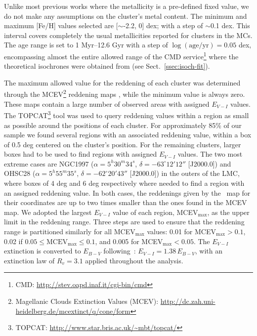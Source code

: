 \documentclass{aa}
\begin{document}
Unlike most previous works where the metallicity is a pre-defined fixed
value, we do not make any assumptions on the cluster's metal content. The
minimum and maximum [Fe/H] values selected are [$\sim$-2.2, 0] dex; with a step
of $\sim$0.1 dex. This interval covers completely the usual metallicities
reported for clusters in the MCs.
The age range is set to 1 Myr--12.6 Gyr with a step of
$\log\mathrm{(age/yr)}=0.05$ dex, encompassing almost the entire allowed range
of the CMD service\footnote{CMD\@: \url{http://stev.oapd.inaf.it/cgi-bin/cmd}}
where the theoretical isochrones were obtained from (see
Sect.~\ref{ssec:isoch-fit}).

The maximum allowed value for the reddening of each cluster was determined
through the MCEV\footnote{Magellanic Clouds Extinction Values (MCEV):
\url{http://dc.zah.uni-heidelberg.de/mcextinct/q/cone/form}} reddening maps
\citep{Haschke_2011}, while the minimum value is always zero.
%
These maps contain a large number of observed areas with assigned $E_{V-I}$
values.
The TOPCAT\footnote{TOPCAT\@: \url{http://www.star.bris.ac.uk/~mbt/topcat/}}
tool was used to query reddening values within a region as small as possible
around the positions of each cluster.
For approximately 85\% of our sample we found several regions with an associated
reddening value, within a box of 0.5 deg centered on the cluster's position.
For the remaining clusters, larger boxes had to be used to find regions with
assigned $E_{V-I}$ values. The two most extreme cases are NGC1997
($\alpha{=}5^h30^m34^s$, $\delta{=}-63^\circ12'12''$ [J2000.0]) and OHSC28
($\alpha{=}5^h55^m35^s$, $\delta{=}-62^\circ20'43''$ [J2000.0]) in the outers
of the LMC, where boxes of 4 deg and 6 deg respectively where needed to find a
region with an assigned reddening value. In both cases, the reddenings given by
the~\cite{Schlafly_2011} map for their coordinates are up to two times smaller
than the ones found in the MCEV map.
%
We adopted the largest $E_{V-I}$ value of each region, MCEV$_{\max}$, as the
upper limit in the reddening range. Three steps are used to ensure that the
reddening range is partitioned similarly for all MCEV$_{\max}$ values: 0.01 for
MCEV$_{\max} {>}0.1$, 0.02 if $0.05{\leq}\mathrm{MCEV}_{\max}{\leq}0.1$, and
0.005 for MCEV$_{\max}{<}0.05$.
%
The $E_{V-I}$ extinction is converted to $E_{B-V}$
following~\cite{Tammann_2003}: $E_{V-I}{=}1.38\,E_{B-V}$, with an extinction
law of $R_v{=}3.1$ applied throughout the analysis.
\end{document}
